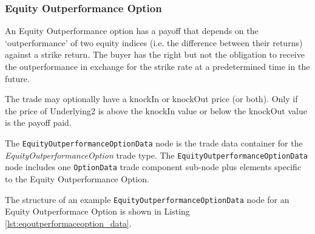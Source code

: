 \subsubsection{Equity Outperformance Option}

\ifdefined{}

\else

An Equity Outperformance option has a payoff that depends on the `outperformance' of two equity indices (i.e. the difference between 
their returns) against a strike return. The buyer has the right but not the obligation to receive the outperformance in 
exchange for the strike rate at a predetermined time in the future.

The trade may optionally have a knockIn or knockOut price (or both). 
Only if the price of Underlying2 is above the knockIn value or below the knockOut value is the payoff paid.

\fi

The \lstinline!EquityOutperformanceOptionData! node is the trade data container for the \emph{EquityOutperformanceOption} trade type. The \lstinline!EquityOutperformanceOptionData!  node includes one  \lstinline!OptionData! trade component sub-node plus elements
specific to the Equity Outperformance Option. 

The structure of an example \lstinline!EquityOutperformanceOptionData! node for an Equity Outperformace Option is shown in Listing
\ref{lst:eqoutperformaceoption_data}.

